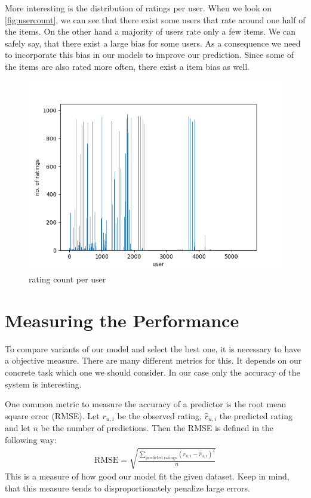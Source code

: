 \documentclass[DIV=14,twocolumn]{scrartcl}
\begin{document}
More interesting is the distribution of ratings per user. When we look on \autoref{fig:usercount}, we can see that there exist some users that rate around one half of the items. On the other hand a majority of users rate only a few items. We can safely say, that there exist a large bias for some users. As a consequence we need to incorporate this bias in our models to improve our prediction.
Since some of the items are also rated more often, there exist a item bias as well. 
\begin{figure}
	\includegraphics[width=\columnwidth]{../img/user-count}
	\caption{rating count per user}
	\label{fig:usercount}
\end{figure}

\section{Measuring the Performance}
To compare variants of our model and select the best one, it is necessary to have a objective measure. There are many different metrics for this. It depends on our concrete task which one we should consider. In our case only the accuracy of the system is interesting.

One common metric to measure the accuracy of a predictor is the root mean square error (RMSE). Let $r_{u,i}$ be the observed rating, $\hat{r}_{u,i}$ the predicted rating and let $n$ be the number of predictions. Then the RMSE is defined in the following way: 
\begin{equation*}
\begin{split}
\text{RMSE} = \sqrt{\frac{\sum_{\text{predicted ratings}} (r_{u,i}-\hat{r}_{u,i})^2}{n}}
\end{split}
\end{equation*}
This is a measure of how good our model fit the given dataset. Keep in mind, that this measure tends to disproportionately penalize large errors. 
\end{document}
